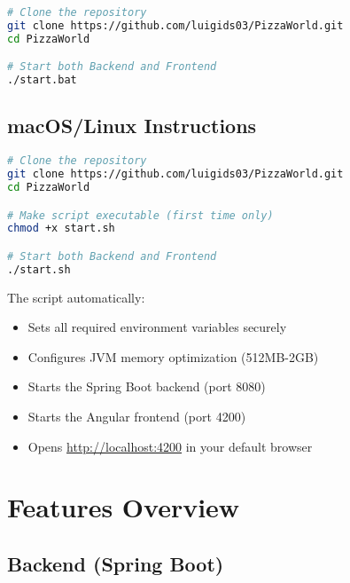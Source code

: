 \documentclass[11pt,a4paper]{article}
\begin{document}
\begin{lstlisting}[language=bash, caption=Windows Installation]
# Clone the repository
git clone https://github.com/luigids03/PizzaWorld.git
cd PizzaWorld

# Start both Backend and Frontend
./start.bat
\end{lstlisting}

\subsection{macOS/Linux Instructions}

\begin{lstlisting}[language=bash, caption=macOS/Linux Installation]
# Clone the repository
git clone https://github.com/luigids03/PizzaWorld.git
cd PizzaWorld

# Make script executable (first time only)
chmod +x start.sh

# Start both Backend and Frontend
./start.sh
\end{lstlisting}

The script automatically:
\begin{itemize}[leftmargin=*]
    \item Sets all required environment variables securely
    \item Configures JVM memory optimization (512MB-2GB)
    \item Starts the Spring Boot backend (port 8080)
    \item Starts the Angular frontend (port 4200)
    \item Opens \href{http://localhost:4200}{http://localhost:4200} in your default browser
\end{itemize}

\section{Features Overview}

\subsection{Backend (Spring Boot)}
\end{document}
